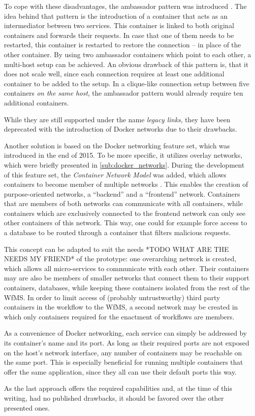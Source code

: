   To cope with these disadvantages, the ambassador pattern was introduced \cite{Docker2016Docker}. The idea behind that pattern is the introduction of a container that acts as an intermediator between two services. This container is linked to both original containers and forwards their requests. In case that one of them needs to be restarted, this container is restarted to restore the connection -- in place of the other container.
  By using two ambassador containers which point to each other, a multi-host setup can be achieved.
  An obvious drawback of this pattern is, that it does not scale well, since each connection requires at least one additional container to be added to the setup. In a clique-like connection setup between five containers \emph{on the same host}, the ambassador pattern would already require ten additional containers.

  While they are still supported under the name \emph{legacy links}, they have been deprecated with the introduction of Docker networks due to their drawbacks.

  Another solution is based on the Docker networking feature set, which was introduced in the end of 2015.
  To be more specific, it utilizes overlay networks, which were briefly presented in \ref{sub:docker_networks}. During the development of this feature set, the \emph{Container Network Model} was added, which allows containers to become member of multiple networks \cite{Tucker2015Docker}.
  This enables the creation of purpose-oriented networks, \eg a ``backend'' and a ``frontend'' network. Containers that are members of both networks can communicate with all containers, while containers which are exclusively connected to the frontend network can only see other containers of this network. This way, one could for example force access to a database to be routed through a container that filters malicious requests.

  This concept can be adapted to suit the needs *TODO WHAT ARE THE NEEDS MY FRIEND* of the prototype: one overarching network is created, which allows all micro-services to communicate with each other. Their containers may are also be members of smaller networks that connect them to their support containers, \eg databases, while keeping these containers isolated from the rest of the \ac{WfMS}. In order to limit access of (probably untrustworthy) third party containers in the workflow to the \ac{WfMS}, a second network may be created in which only containers required for the enactment of workflows are members.

  As a convenience of Docker networking, each service can simply be addressed by its container's name and its port. As long as their required ports are not exposed on the host's network interface, any number of containers may be reachable on the same port. This is especially beneficial for running multiple containers that offer the same application, since they all can use their default ports this way.

  As the last approach offers the required capabilities and, at the time of this writing, had no published drawbacks, it should be favored over the other presented ones.
